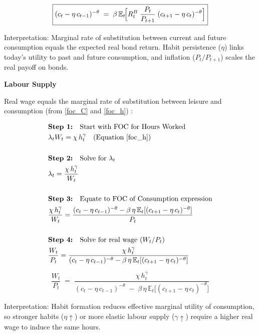 \documentclass[11pt,preprint]{elsarticle}
\numberwithin{equation}{section}
\numberwithin{figure}{section}
\numberwithin{table}{section}
\begin{document}
\begin{equation}\label{consEuler_app}
\boxed{%
  (c_t - \eta\,c_{t-1})^{-\theta}
  \;=\;
  \beta\,\mathbb{E}_t\!\Bigl[
    R_t^B \;\frac{P_t}{P_{t+1}}\;(c_{t+1} - \eta\,c_t)^{-\theta}
  \Bigr]
}
\end{equation}

Interpretation: Marginal rate of substitution between current and future
consumption equals the expected real bond return. Habit persistence
(\(\eta\)) links today's utility to past and future consumption, and
inflation (\(P_t/P_{t+1}\)) scales the real payoff on bonds.

\textbf{Labour Supply}

Real wage equals the marginal rate of substitution between leisure and
consumption (from \eqref{foc_C} and \eqref{foc_h}) :

\begin{align*}
& \textbf{Step 1:} \quad \text{Start with FOC for Hours Worked} \\
& \lambda_t W_t = \chi\,h_t^{\gamma} \quad \text{(Equation \ref{foc_h})} \\
& \\
& \textbf{Step 2:} \quad \text{Solve for } \lambda_t \\
& \lambda_t = \frac{\chi\,h_t^{\gamma}}{W_t} \\
& \\
& \textbf{Step 3:} \quad \text{Equate to FOC of Consumption expression} \\
& \frac{\chi\,h_t^{\gamma}}{W_t} = \frac{(c_t - \eta\,c_{t-1})^{-\theta} - \beta\,\eta\,\mathbb{E}_t[(c_{t+1} - \eta\,c_t)^{-\theta}]}{P_t} \\
& \\
& \textbf{Step 4:} \quad \text{Solve for real wage } (W_t/P_t) \\
& \frac{W_t}{P_t} = \frac{\chi\,h_t^{\gamma}}{(c_t - \eta\,c_{t-1})^{-\theta} - \beta\,\eta\,\mathbb{E}_t[(c_{t+1} - \eta\,c_t)^{-\theta}]}
\end{align*}

\begin{equation}\label{labourSupply_app}
\boxed{
  \frac{W_t}{P_t}
  \;=\;
  \frac{\chi\,h_t^{\gamma}}
       {(c_t - \eta\,c_{t-1})^{-\theta}
        \;-\;
        \beta\,\eta\,\mathbb{E}_t\!\bigl[(c_{t+1} - \eta\,c_t)^{-\theta}\bigr]}
}
\end{equation}

Interpretation: Habit formation reduces effective marginal utility of
consumption, so stronger habits (\(\eta\uparrow\)) or more elastic
labour supply (\(\gamma\uparrow\)) require a higher real wage to induce
the same hours.
\end{document}
